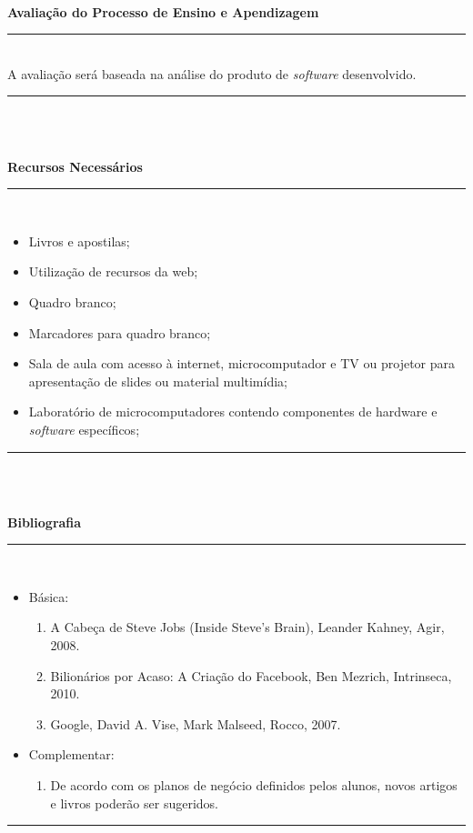 \\
\vspace{-12mm}
\begin{center}\textbf{Avaliação do Processo de Ensino e Apendizagem}\end{center}
\vspace{-5mm}
\noindent\rule{16.5cm}{0.4pt}
\\
   A avalia\c{c}\~ao ser\'a baseada na an\'alise do produto de \textit{software} desenvolvido.\\
\noindent\rule{16.5cm}{0.4pt}\\
\\
\vspace{-12mm}
\begin{center}\textbf{Recursos Necessários}\end{center}
\vspace{-5mm}
\noindent\rule{16.5cm}{0.4pt}
\\
\begin{itemize} 
  \item Livros e apostilas;
  \item Utilização de recursos da web;
  \item Quadro branco;
  \item Marcadores para quadro branco;
  \item Sala de aula com acesso à internet, microcomputador e TV ou projetor para apresentação de slides ou material multimídia;
  \item Laboratório de microcomputadores contendo componentes de hardware e \textit{software} específicos;
\end{itemize}
\noindent\rule{16.5cm}{0.4pt}\\
\\
\vspace{-12mm}
\begin{center}\textbf{Bibliografia}\end{center}
\vspace{-5mm}
\noindent\rule{16.5cm}{0.4pt}
\\
\begin{itemize} 

  \item Básica:
	\begin{enumerate}
	\item A Cabeça de Steve Jobs (Inside Steve's Brain), Leander Kahney, Agir, 2008.
	\item Bilionários por Acaso: A Criação do Facebook, Ben Mezrich, Intrinseca, 2010.
	\item Google, David A. Vise, Mark Malseed, Rocco, 2007.
	\end{enumerate}
  \item Complementar:
	\begin{enumerate} 
	\item De acordo com os planos de negócio definidos pelos alunos, novos artigos e livros poderão ser sugeridos.
	\end{enumerate}
\end{itemize}
\noindent\rule{16.5cm}{0.4pt}\\
\\
